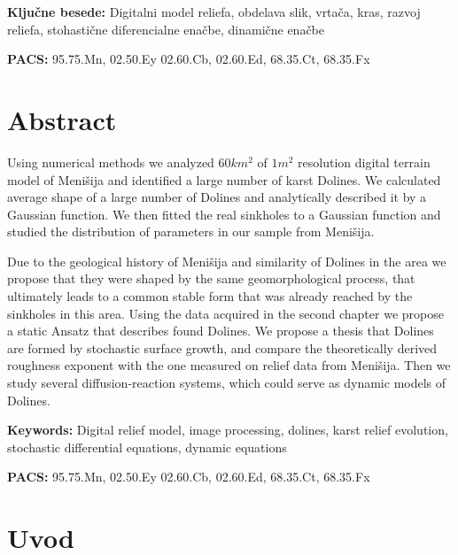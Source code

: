 \documentclass[a4paper, twoside, 12pt]{book}
\begin{document}
\vspace*{1cm}

\noindent \textbf{Ključne besede:} Digitalni model reliefa, obdelava slik, vrtača, kras, razvoj reliefa, stohastične diferencialne enačbe, dinamične enačbe
\smallskip

\noindent \textbf{PACS:} 95.75.Mn, 02.50.Ey 02.60.Cb, 02.60.Ed, 68.35.Ct, 68.35.Fx

\newpage \thispagestyle{empty}

 
\chapter*{Abstract}

  Using numerical methods we analyzed $60 km^2$ of $1m^2$ resolution digital terrain model of Menišija and identified a large number of karst Dolines. We calculated average shape of a large number of Dolines and analytically described it by a Gaussian function. We then fitted the real sinkholes to a Gaussian function and studied the distribution of parameters in our sample from Menišija.

  Due to the geological history of Menišija and similarity of Dolines in the area we propose that they were shaped by the same geomorphological process, that ultimately leads to a common stable form that was already reached by the sinkholes in this area.
  Using the data acquired in the second chapter we propose a static Ansatz that describes found Dolines. We propose a thesis that Dolines are formed by stochastic surface growth, and compare the theoretically derived roughness exponent with the one measured on relief data from Menišija. Then we study several diffusion-reaction systems, which could serve as dynamic models of Dolines.

\vspace*{1cm}

\noindent \textbf{Keywords:} Digital relief model, image processing, dolines, karst relief evolution, stochastic differential equations, dynamic equations
\smallskip

\noindent \textbf{PACS:} 95.75.Mn, 02.50.Ey 02.60.Cb, 02.60.Ed, 68.35.Ct, 68.35.Fx


\newpage \thispagestyle{empty}

\mainmatter
\setcounter{page}{1}
\pagestyle{fancy}
\rhead{\thepage}


  \chapter{Uvod}
  \label{ch:uvod}
\end{document}
